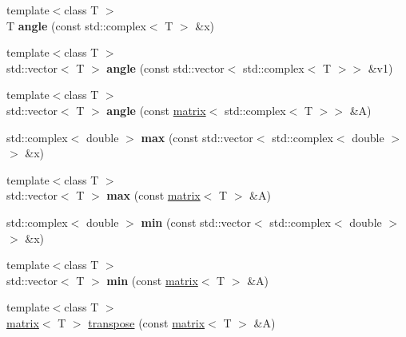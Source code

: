 \begin{DoxyCompactItemize}
\item 
\hypertarget{namespacekeycpp_aaa2e17334911e8a447a5ef6c0cc54c3f}{{\footnotesize template$<$class T $>$ }\\T {\bfseries angle} (const std\-::complex$<$ T $>$ \&x)}\label{namespacekeycpp_aaa2e17334911e8a447a5ef6c0cc54c3f}

\item 
\hypertarget{namespacekeycpp_a9aed8b7c5c058bda28186010d2f3833f}{{\footnotesize template$<$class T $>$ }\\std\-::vector$<$ T $>$ {\bfseries angle} (const std\-::vector$<$ std\-::complex$<$ T $>$$>$ \&v1)}\label{namespacekeycpp_a9aed8b7c5c058bda28186010d2f3833f}

\item 
\hypertarget{namespacekeycpp_af0c9c769d613f7526406ecf3b3351d89}{{\footnotesize template$<$class T $>$ }\\std\-::vector$<$ T $>$ {\bfseries angle} (const \hyperlink{classkeycpp_1_1matrix}{matrix}$<$ std\-::complex$<$ T $>$$>$ \&A)}\label{namespacekeycpp_af0c9c769d613f7526406ecf3b3351d89}

\item 
\hypertarget{namespacekeycpp_a35292f7ead7b19a2fc098f50f0147ce6}{std\-::complex$<$ double $>$ {\bfseries max} (const std\-::vector$<$ std\-::complex$<$ double $>$ $>$ \&x)}\label{namespacekeycpp_a35292f7ead7b19a2fc098f50f0147ce6}

\item 
\hypertarget{namespacekeycpp_af7ff5485352bd4412d18050843809d42}{{\footnotesize template$<$class T $>$ }\\std\-::vector$<$ T $>$ {\bfseries max} (const \hyperlink{classkeycpp_1_1matrix}{matrix}$<$ T $>$ \&A)}\label{namespacekeycpp_af7ff5485352bd4412d18050843809d42}

\item 
\hypertarget{namespacekeycpp_aa0241416e190842fd0c352a6c94c57c3}{std\-::complex$<$ double $>$ {\bfseries min} (const std\-::vector$<$ std\-::complex$<$ double $>$ $>$ \&x)}\label{namespacekeycpp_aa0241416e190842fd0c352a6c94c57c3}

\item 
\hypertarget{namespacekeycpp_a33adfcd8368c2f96891ca3e27fd8affe}{{\footnotesize template$<$class T $>$ }\\std\-::vector$<$ T $>$ {\bfseries min} (const \hyperlink{classkeycpp_1_1matrix}{matrix}$<$ T $>$ \&A)}\label{namespacekeycpp_a33adfcd8368c2f96891ca3e27fd8affe}

\item 
\hypertarget{namespacekeycpp_a7fd5ce0385e9cc7bed5b44ed8475e8aa}{{\footnotesize template$<$class T $>$ }\\\hyperlink{classkeycpp_1_1matrix}{matrix}$<$ T $>$ \hyperlink{namespacekeycpp_a7fd5ce0385e9cc7bed5b44ed8475e8aa}{transpose} (const \hyperlink{classkeycpp_1_1matrix}{matrix}$<$ T $>$ \&A)}\label{namespacekeycpp_a7fd5ce0385e9cc7bed5b44ed8475e8aa}


\end{DoxyCompactItemize}
